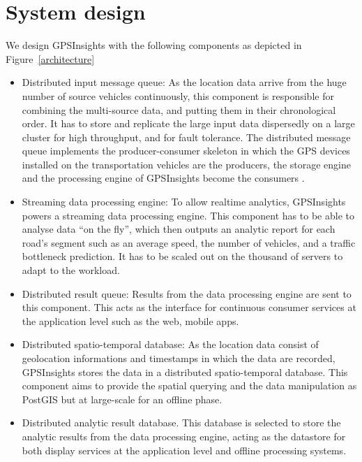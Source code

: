 \documentclass{acm_proc_article-sp}
\begin{document}
\section{System design} 

We design GPSInsights with the following components as depicted in Figure~\ref{architecture}

\begin{itemize}
\item 	Distributed input message queue: As the location data arrive from the huge number of source vehicles continuously, this component is responsible for combining the multi-source data, and putting them in their chronological order. It has to store and replicate the large input data dispersedly on a large cluster for high throughput, and for fault tolerance. The distributed message queue implements the producer-consumer skeleton in which the GPS devices installed on the transportation vehicles are the producers, the storage engine and the processing engine of GPSInsights become the consumers	.

\item  Streaming data processing engine: To allow realtime analytics, GPSInsights powers a streaming data processing engine. This component has to be able to analyse data ``on the fly'', which then outputs an analytic report for each road's segment such as an average speed, the number of vehicles, and a traffic bottleneck prediction. It has to be scaled out on the thousand of servers to adapt to the workload.

\item  Distributed result queue: Results from the data processing engine are sent to this component. This acts as the interface for continuous consumer services at the application level such as the web, mobile apps. 

\item  Distributed spatio-temporal database: As the location data consist of geolocation informations and timestamps in which the data are recorded, GPSInsights stores the data in a distributed spatio-temporal database. This component aims to provide the spatial querying and the data manipulation as PostGIS but at large-scale for an offline phase. 

\item  Distributed analytic result database. This database is selected to store the analytic results from the data processing engine, acting as the datastore for both display services at the application level and offline processing systems. 

\end{itemize}
\end{document}
